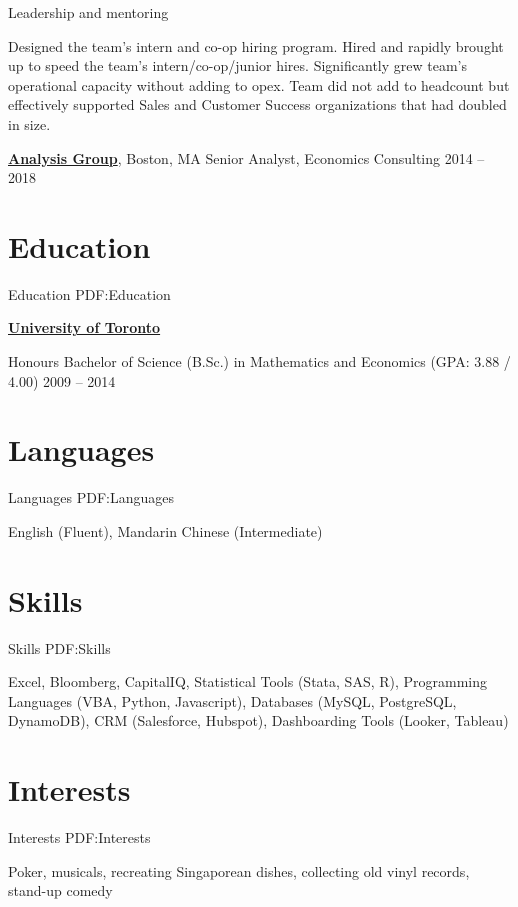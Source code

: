 \documentclass[letterpaper,10pt,oneside]{article}
\begin{document}
\begin{body}
\begin{flushleft}
\vspace{0.75em}
\BulletItem Leadership and mentoring

\vspace{0.5em} \SubBulletItem Designed the team's intern and co-op hiring program. Hired and rapidly brought up to speed the team's intern/co-op/junior hires. Significantly grew team's operational capacity without adding to opex. Team did not add to headcount but effectively supported Sales and Customer Success organizations that had doubled in size.

\end{flushleft}

\vspace{0.75em}
\href{http://www.analysisgroup.com/}
{\textbf{Analysis Group}},
Boston, MA
\GapNoBreak
Senior Analyst,
Economics Consulting
\hfill
2014 --
2018

\section
{Education}
{Education}
{PDF:Education}

\href{https://www.utoronto.ca/}
{\textbf{University of Toronto}}

\GapNoBreak
\BulletItem
Honours Bachelor of Science (B.Sc.) in Mathematics and Economics (GPA: 3.88 / 4.00)
\hfill
2009 -- 2014


\section
{Languages}
{Languages}
{PDF:Languages}

English (Fluent), Mandarin Chinese (Intermediate)


\section
{Skills}
{Skills}
{PDF:Skills}

Excel, Bloomberg, CapitalIQ, Statistical Tools (Stata, SAS, R), Programming Languages (VBA, Python, Javascript), Databases (MySQL, PostgreSQL, DynamoDB), CRM (Salesforce, Hubspot), Dashboarding Tools (Looker, Tableau)


\section
{Interests}
{Interests}
{PDF:Interests}

Poker, musicals, recreating Singaporean dishes, collecting old vinyl records, stand-up comedy

\end{body}
\end{document}
